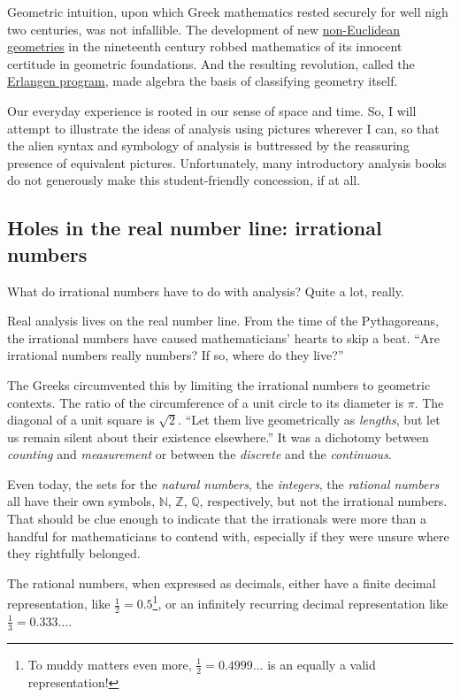 \documentclass[
  a4paper,
]{article}
\begin{document}
Geometric intuition, upon which Greek mathematics rested securely for
well nigh two centuries, was not infallible. The development of new
\href{https://en.wikipedia.org/wiki/Non-Euclidean_geometry}{non-Euclidean
geometries} in the nineteenth century robbed mathematics of its innocent
certitude in geometric foundations. And the resulting revolution, called
the \href{https://en.wikipedia.org/wiki/Erlangen_program}{Erlangen
program}, made algebra the basis of classifying geometry itself.

Our everyday experience is rooted in our sense of space and time. So, I
will attempt to illustrate the ideas of analysis using pictures wherever
I can, so that the alien syntax and symbology of analysis is buttressed
by the reassuring presence of equivalent pictures. Unfortunately, many
introductory analysis books do not generously make this student-friendly
concession, if at all.

\subsection{Holes in the real number line: irrational
numbers}\label{holes-in-the-real-number-line-irrational-numbers}

What do irrational numbers have to do with analysis? Quite a lot,
really.

Real analysis lives on the real number line. From the time of the
Pythagoreans, the irrational numbers have caused mathematicians' hearts
to skip a beat. ``Are irrational numbers really numbers? If so, where do
they live?''

The Greeks circumvented this by limiting the irrational numbers to
geometric contexts. The ratio of the circumference of a unit circle to
its diameter is \(\pi\). The diagonal of a unit square is \(\sqrt{2}\).
``Let them live geometrically as \emph{lengths}, but let us remain
silent about their existence elsewhere.'' It was a dichotomy between
\emph{counting} and \emph{measurement} or between the \emph{discrete}
and the \emph{continuous}.

Even today, the sets for the \emph{natural numbers}, the
\emph{integers}, the \emph{rational numbers} all have their own symbols,
\(\mathbb{N}\), \(\mathbb{Z}\), \(\mathbb{Q}\), respectively, but not
the irrational numbers. That should be clue enough to indicate that the
irrationals were more than a handful for mathematicians to contend with,
especially if they were unsure where they rightfully belonged.

The rational numbers, when expressed as decimals, either have a finite
decimal representation, like \(\frac{1}{2} = 0.5\)\footnote{To muddy
  matters even more, \(\frac{1}{2} = 0.4999\dots\) is an equally a valid
  representation!}, or an infinitely recurring decimal representation
like \(\frac{1}{3} = 0.333\dots\).
\end{document}
